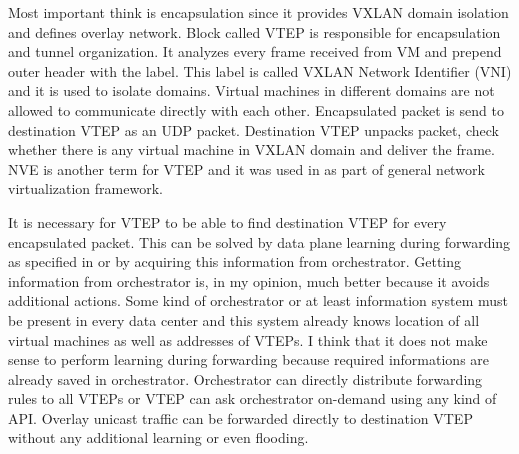 Most important think is encapsulation since it provides \Ac{VXLAN} domain isolation and defines overlay network. Block called \Ac{VTEP} is responsible for encapsulation and tunnel organization. It analyzes every frame received from \Ac{VM} and prepend outer header with the label. This label is called \Ac{VXLAN} Network Identifier (\Ac{VNI}) and it is used to isolate domains. Virtual machines in different domains are not allowed to communicate directly with each other. Encapsulated packet is send to destination \Ac{VTEP} as an \Ac{UDP} packet. Destination \Ac{VTEP} unpacks packet, check whether there is any virtual machine in \Ac{VXLAN} domain and deliver the frame. \Ac{NVE} is another term for \Ac{VTEP} and it was used in \cite{rfc7365} as part of general network virtualization framework.

It is necessary for \Ac{VTEP} to be able to find destination \Ac{VTEP} for every encapsulated packet. This can be solved by data plane learning during forwarding as specified in \cite{rfc7348} or by acquiring this information from orchestrator. Getting information from orchestrator is, in my opinion, much better because it avoids additional actions. Some kind of orchestrator or at least information system must be present in every data center and this system already knows location of all virtual machines as well as addresses of \Ac{VTEP}s. I think that it does not make sense to perform learning during forwarding because required informations are already saved in orchestrator. Orchestrator can directly distribute forwarding rules to all \Ac{VTEP}s or \Ac{VTEP} can ask orchestrator on-demand using any kind of \Ac{API}. Overlay unicast traffic can be forwarded directly to destination \Ac{VTEP} without any additional learning or even flooding.


